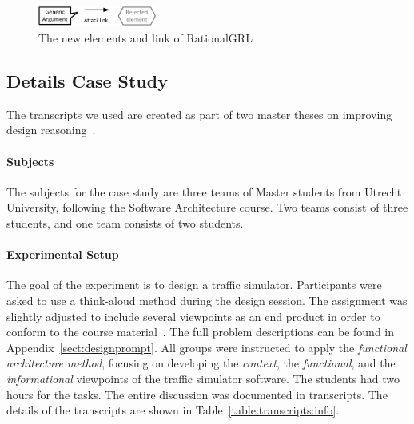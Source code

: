 \begin{figure}[h]
\centering
\includegraphics[width=0.35\textwidth]{img/legend}
\caption{The new elements and link of RationalGRL}
\label{fig:rationalgrllegend}
\end{figure}

\subsection{Details Case Study}
The transcripts we used are created as part of two master theses on improving design reasoning~\cite{masterthesis1,masterthesis2}.

\paragraph{Subjects} The subjects for the case study are three teams of Master students from Utrecht University, following the Software Architecture course. Two teams consist of three students, and one team consists of two students.

\paragraph{Experimental Setup} The goal of the experiment is to design a traffic simulator. Participants were asked to use a think-aloud method during the design session. The assignment was slightly adjusted to include several viewpoints as an end product in order to conform to the course material~\cite{Bass:2012:SAP:2392670}. The full problem descriptions can be found in Appendix~\ref{sect:designprompt}. All groups were instructed to apply the \emph{functional architecture method}, focusing on developing the \emph{context}, the \emph{functional}, and the \emph{informational} viewpoints of the traffic simulator software. The students had two hours for the tasks. The entire discussion was documented in transcripts. The details of the transcripts are shown in Table~\ref{table:transcripts:info}.

